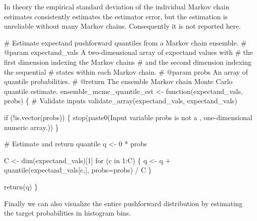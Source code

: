 \documentclass[
  letterpaper,
  DIV=11,
  numbers=noendperiod]{scrartcl}
\newenvironment{Shaded}{\begin{snugshade}}{\end{snugshade}}
\newcommand{\CommentTok}[1]{\textcolor[rgb]{0.37,0.37,0.37}{#1}}
\newcommand{\ControlFlowTok}[1]{\textcolor[rgb]{0.00,0.23,0.31}{#1}}
\newcommand{\DecValTok}[1]{\textcolor[rgb]{0.68,0.00,0.00}{#1}}
\newcommand{\KeywordTok}[1]{\textcolor[rgb]{0.00,0.23,0.31}{#1}}
\newcommand{\NormalTok}[1]{\textcolor[rgb]{0.00,0.23,0.31}{#1}}
\newcommand{\OperatorTok}[1]{\textcolor[rgb]{0.37,0.37,0.37}{#1}}
\newcommand{\StringTok}[1]{\textcolor[rgb]{0.13,0.47,0.30}{#1}}
\begin{document}
In theory the empirical standard deviation of the individual Markov
chain estimates consistently estimates the estimator error, but the
estimation is unreliable without many Markov chains. Consequently it is
not reported here.

\begin{Shaded}
\begin{Highlighting}[]
\CommentTok{\# Estimate expectand pushforward quantiles from a Markov chain ensemble.}
\CommentTok{\# @param expectand\_vals A two{-}dimensional array of expectand values with}
\CommentTok{\#                       the first dimension indexing the Markov chains}
\CommentTok{\#                       and the second dimension indexing the sequential}
\CommentTok{\#                       states within each Markov chain.}
\CommentTok{\# @param probs An array of quantile probabilities.}
\CommentTok{\# @return The ensemble Markov chain Monte Carlo quantile estimate.}
\NormalTok{ensemble\_mcmc\_quantile\_est }\OperatorTok{\textless{}{-}}\NormalTok{ function(expectand\_vals, probs) \{}
  \CommentTok{\# Validate inputs}
\NormalTok{  validate\_array(expectand\_vals, }\StringTok{\textquotesingle{}expectand\_vals\textquotesingle{}}\NormalTok{)}

  \ControlFlowTok{if}\NormalTok{ (}\OperatorTok{!}\KeywordTok{is}\NormalTok{.vector(probs)) \{}
\NormalTok{    stop(paste0(}\StringTok{\textquotesingle{}Input variable \textasciigrave{}probs\textasciigrave{} is not a \textquotesingle{}}\NormalTok{,}
                \StringTok{\textquotesingle{}one{-}dimensional numeric array.\textquotesingle{}}\NormalTok{))}
\NormalTok{  \}}

  \CommentTok{\# Estimate and return quantile}
\NormalTok{  q }\OperatorTok{\textless{}{-}} \DecValTok{0} \OperatorTok{*}\NormalTok{ probs}

\NormalTok{  C }\OperatorTok{\textless{}{-}}\NormalTok{ dim(expectand\_vals)[}\DecValTok{1}\NormalTok{]}
  \ControlFlowTok{for}\NormalTok{ (c }\KeywordTok{in} \DecValTok{1}\NormalTok{:C) \{}
\NormalTok{    q }\OperatorTok{\textless{}{-}}\NormalTok{ q }\OperatorTok{+}\NormalTok{ quantile(expectand\_vals[c,], probs}\OperatorTok{=}\NormalTok{probs) }\OperatorTok{/}\NormalTok{ C}
\NormalTok{  \}}

  \ControlFlowTok{return}\NormalTok{(q)}
\NormalTok{\}}
\end{Highlighting}
\end{Shaded}

Finally we can also visualize the entire pushforward distribution by
estimating the target probabilities in histogram bins.
\end{document}
